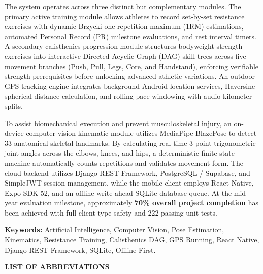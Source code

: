 \documentclass[12pt,a4paper]{report}
\begin{document}
The system operates across three distinct but complementary modules. The primary active training module allows athletes to record set-by-set resistance exercises with dynamic Brzycki one-repetition maximum (1RM) estimations, automated Personal Record (PR) milestone evaluations, and rest interval timers. A secondary calisthenics progression module structures bodyweight strength exercises into interactive Directed Acyclic Graph (DAG) skill trees across five movement branches (Push, Pull, Legs, Core, and Handstand), enforcing verifiable strength prerequisites before unlocking advanced athletic variations. An outdoor GPS tracking engine integrates background Android location services, Haversine spherical distance calculation, and rolling pace windowing with audio kilometer splits.

To assist biomechanical execution and prevent musculoskeletal injury, an on-device computer vision kinematic module utilizes MediaPipe BlazePose to detect 33 anatomical skeletal landmarks. By calculating real-time 3-point trigonometric joint angles across the elbows, knees, and hips, a deterministic finite-state machine automatically counts repetitions and validates movement form. The cloud backend utilizes Django REST Framework, PostgreSQL / Supabase, and SimpleJWT session management, while the mobile client employs React Native, Expo SDK 52, and an offline write-ahead SQLite database queue. At the mid-year evaluation milestone, approximately \textbf{70\% overall project completion} has been achieved with full client type safety and 222 passing unit tests.

\vspace{0.8cm}
\textbf{Keywords:} Artificial Intelligence, Computer Vision, Pose Estimation, Kinematics, Resistance Training, Calisthenics DAG, GPS Running, React Native, Django REST Framework, SQLite, Offline-First.

\newpage

\thispagestyle{plain}
\begingroup
\setlength{\parskip}{2pt}
\tableofcontents
\endgroup
\newpage

\thispagestyle{plain}
\begingroup
\setlength{\parskip}{2pt}
\listoffigures
\endgroup
\newpage

\thispagestyle{plain}
\begingroup
\setlength{\parskip}{2pt}
\listoftables
\endgroup
\newpage

\thispagestyle{plain}
\begin{center}
    {\fontsize{15pt}{18pt}\bfseries LIST OF ABBREVIATIONS}\\[1cm]
\end{center}
\end{document}

